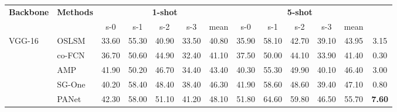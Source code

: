 \begin{table*}[htbp] \small
\begin{center}
\begin{tabular}{|l|l|ccccc|ccccc|c|}
\hline
\multicolumn{1}{|l|}{\multirow{2}{*}{\textbf{Backbone}}} & \multirow{2}{*}{\textbf{Methods}} & \multicolumn{5}{c|}{\textbf{1-shot}}                                                                              & \multicolumn{5}{c|}{\textbf{5-shot}}                                                                             & \multirow{2}{*}{} \multirow{2}{*}{}         \\ \cline{3-12}
\multicolumn{1}{|l|}{}                          &                          & s-0            & s-1            & s-2            & s-3            & mean                                & s-0            & s-1            & s-2            & s-3            & mean                                &                           \\ \hline\hline
\multirow{6}{*}{VGG-16}                         & OSLSM \cite{oslsm}                    & 33.60          & 55.30          & 40.90          & 33.50          & 40.80                               & 35.90          & 58.10          & 42.70          & 39.10          & 43.95                               & 3.15                      \\
                                                & co-FCN \cite{co-fcn}                   & 36.70          & 50.60          & 44.90          & 32.40          & 41.10                               & 37.50          & 50.00          & 44.10          & 33.90          & 41.40                               & 0.30                      \\
                                                & AMP \cite{amp}                      & 41.90          & 50.20          & 46.70          & 34.40          & 43.40                               & 40.30          & 55.30          & 49.90          & 40.10          & 46.40                               & 3.00                      \\
                                                & SG-One \cite{sgone}                   & 40.20          & 58.40          & 48.40          & 38.40          & 46.30                               & 41.90          & 58.60          & 48.60          & 39.40          & 47.10                               & 0.80                      \\
                                                & PANet \cite{panet}                    & 42.30          & 58.00          & 51.10          & 41.20          & 48.10                               & 51.80          & 64.60          & 59.80          & 46.50          & 55.70                               & \textbf{7.60}                      \\

\end{tabular}
\end{center}
\end{table*}
